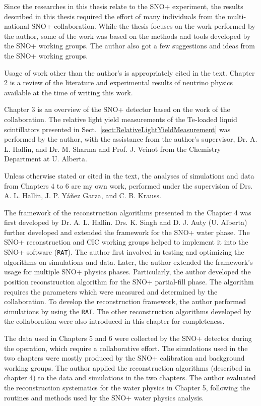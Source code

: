 Since the researches in this thesis relate to the SNO+ experiment, the results described in this thesis required the effort of many individuals from the multi-national SNO+ collaboration. While the thesis focuses on the work performed by the author, some of the work was based on the methods and tools developed by the SNO+ working groups. The author also got a few suggestions and ideas from the SNO+ working groups.

Usage of work other than the author's is appropriately cited in the text. Chapter 2 is a review of the literature and experimental results of neutrino physics available at the time of writing this work. 

Chapter 3 is an overview of the SNO+ detector based on the work of the collaboration. The relative light yield measurements of the Te-loaded liquid scintillators presented in Sect.~\ref{sect:RelativeLightYieldMeasurement} was performed by the author, with the assistance from the author's supervisor, Dr. A. L. Hallin, and Dr. M. Sharma and Prof. J. Veinot from the Chemistry Department at U. Alberta.

Unless otherwise stated or cited in the text, the analyses of simulations and data from Chapters 4 to 6 are my own work, performed under the supervision of Drs. A. L. Hallin, J. P. Y\'{a}\~{n}ez Garza, and C. B. Krauss. 

The framework of the reconstruction algorithms presented in the Chapter 4 was first developed by Dr. A. L. Hallin. Drs. K. Singh and D. J. Auty (U. Alberta) further developed and extended the framework for the SNO+ water phase. The SNO+ reconstruction and CIC working groups helped to implement it into the SNO+ software (\texttt{RAT}). The author first involved in testing and optimizing the algorithms on simulations and data. Later, the author extended the framework's usage for multiple SNO+ physics phases. Particularly, the author developed the position reconstruction algorithm for the SNO+ partial-fill phase. The algorithm requires the parameters which were measured and determined by the collaboration. To develop the reconstruction framework, the author performed simulations by using the \texttt{RAT}. The other reconstruction algorithms developed by the collaboration were also introduced in this chapter for completeness.
 
The data used in Chapters 5 and 6 were collected by the SNO+ detector during the operation, which require a collaborative effort. The simulations used in the two chapters were mostly produced by the SNO+ calibration and background working groups. The author applied the reconstruction algorithms (described in chapter 4) to the data and simulations in the two chapters. The author evaluated the reconstruction systematics for the water physics in Chapter 5, following the routines and methods used by the SNO+ water physics analysis.

